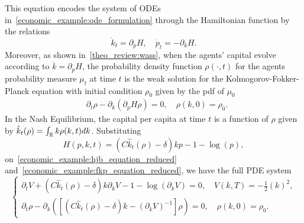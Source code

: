 This equation encodes the system of ODEs in~\ref{economic_example:ode_formulation} through the Hamiltonian function by the relations
\begin{equation*}
    \dot k_t = \partial_p H,\quad \dot p_t = -\partial_k H.
\end{equation*}
Moreover, as shown in~\ref{theo_review:wass},
when the agents' capital evolve according to $\dot k = \partial_p H$,
the probability density function $\rho(\cdot, t)$ for the agents probability measure $\mu_t$ at time $t$
is the weak solution for the Kolmogorov-Fokker-Planck equation with initial condition $\rho_0$ given by the pdf of $\mu_0$
\begin{equation}\label{economic_example:fkp_equation_reduced}
\begin{split}
    &\partial_t \rho - \partial_k \left( \partial_p H \rho \right) = 0, \quad\rho(k,0) = \rho_0.
\end{split}
\end{equation}
In the Nash Equilibrium, the capital per capita at time $t$ is a function of $\rho$ given by $\hat k_t(\rho) = \int_{\mathbb{R}} k \rho(k,t) dk$.
Substituting 
\begin{equation*}
    H(p,k,t) = \left(C {\hat k_t(\rho) - \delta}\right)k p  - 1  - \log(p),
\end{equation*}
on~\ref{economic_example:hjb_equation_reduced} and~\ref{economic_example:fkp_equation_reduced}, we have the full PDE system
\begin{equation}
    \begin{cases}
        \partial_t V +  \left(C {\hat k_t(\rho) - \delta}\right)k\partial_k V - 1  - \log(\partial_k V) = 0,  \quad V(k,T) = -\frac{1}{2}{(k)}^2,\\
        \partial_t \rho - \partial_k \left( \left[ \left(C {\hat k_t}(\rho) - \delta\right) k - {(\partial_k V)}^{-1} \right]\rho \right) = 0, \quad \rho(k,0) = \rho_0.
    \end{cases}
\end{equation}
\color{black}


